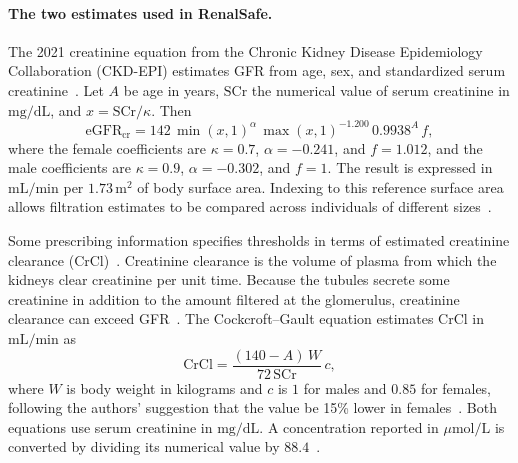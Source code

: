 \documentclass[12pt,a4paper,twoside]{book}
\begin{document}
\paragraph{The two estimates used in RenalSafe.}
The 2021 creatinine equation from the Chronic Kidney Disease Epidemiology Collaboration (CKD-EPI) estimates GFR from age, sex, and standardized serum creatinine~\cite{artInker2021CKDEPI}.
Let \(A\) be age in years, \(\mathrm{SCr}\) the numerical value of serum creatinine in \(\mathrm{mg/dL}\), and \(x=\mathrm{SCr}/\kappa\).
Then
\begin{equation}
    \mathrm{eGFR}_{\mathrm{cr}} =
    142\,\min(x,1)^{\alpha}\,\max(x,1)^{-1.200}\,0.9938^{A}\,f ,
    \label{eq:implemented-ckd-epi}
\end{equation}
where the female coefficients are \(\kappa=0.7\), \(\alpha=-0.241\), and \(f=1.012\), and the male coefficients are \(\kappa=0.9\), \(\alpha=-0.302\), and \(f=1\).
The result is expressed in \(\mathrm{mL/min}\) per \(1.73\,\mathrm{m}^{2}\) of body surface area.
Indexing to this reference surface area allows filtration estimates to be compared across individuals of different sizes~\cite{miscNIDDKDrugDosing}.

Some prescribing information specifies thresholds in terms of estimated creatinine clearance (CrCl)~\cite{artDowling2010RenalDrugDosing,artJones2011RenalFunctionDrugDosing}.
Creatinine clearance is the volume of plasma from which the kidneys clear creatinine per unit time.
Because the tubules secrete some creatinine in addition to the amount filtered at the glomerulus, creatinine clearance can exceed GFR~\cite{artStefani2019AdjustDrugDosesCKD,artStevens2009DrugDosingRecommendations}.
The Cockcroft--Gault equation estimates CrCl in \(\mathrm{mL/min}\) as
\begin{equation}
    \mathrm{CrCl} = \frac{(140-A)\,W}{72\,\mathrm{SCr}}\,c ,
    \label{eq:cockcroft-gault}
\end{equation}
where \(W\) is body weight in kilograms and \(c\) is \(1\) for males and \(0.85\) for females, following the authors' suggestion that the value be 15\% lower in females~\cite{artCockcroftGault1976}.
Both equations use serum creatinine in \(\mathrm{mg/dL}\). A concentration reported in \(\mu\mathrm{mol/L}\) is converted by dividing its numerical value by \(88.4\)~\cite{artStevens2009DrugDosingRecommendations}.
\end{document}
